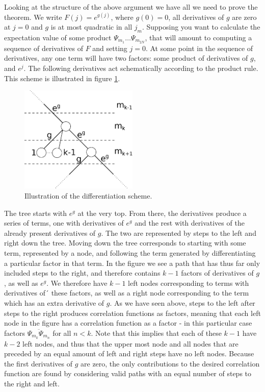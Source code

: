 Looking at the structure of the above argument we have all we need to prove the theorem. We write $F(j) = e^{g(j)}$, where $g(0) = 0$, all derivatives of $g$ are zero at $j = 0$ and $g$ is at most quadratic in all $j_{m}$. Supposing you want to calculate the expectation value of some product $\Psi_{m_{1}}\dots\Psi_{m_{2N}}$, that will amount to computing a sequence of derivatives of $F$ and setting $j = 0$. At some point in the sequence of derivatives, any one term will have two factors: some product of derivatives of $g$, and $e^{j}$. The following derivatives act schematically according to the product rule. This scheme is illustrated in figure \ref{fig:deriv_graph}.

\begin{figure}[!ht]
	\centering
	\includegraphics[width = 0.5\textwidth]{./Images/deriv_graph.eps}
	\caption{Illustration of the differentiation scheme.}
	\label{fig:deriv_graph}
\end{figure}

The tree starts with $e^{g}$ at the very top. From there, the derivatives produce a series of terms, one with derivatives of $e^{g}$ and the rest with derivatives of the already present derivatives of $g$. The two are represented by steps to the left and right down the tree. Moving down the tree corresponds to starting with some term, represented by a node, and following the term generated by differentiating a particular factor in that term. In the figure we see a path that has thus far only included steps to the right, and therefore contains $k - 1$ factors of derivatives of $g$, as well as $e^{g}$. We therefore have $k - 1$ left nodes corresponding to terms with derivatives of´ these factors, as well as a right node corresponding to the term which has an extra derivative of $g$. As we have seen above, steps to the left after steps to the right produces correlation functions as factors, meaning that each left node in the figure has a correlation function as a factor - in this particular case factors $\overline{\Psi_{m_{k}}\Psi_{m_{n}}}$ for all $n < k$. Note that this implies that each of these $k - 1$ have $k - 2$ left nodes, and thus that the upper most node and all nodes that are preceded by an equal amount of left and right steps have no left nodes. Because the first derivatives of $g$ are zero, the only contributions to the desired correlation function are found by considering valid paths with an equal number of steps to the right and left.

